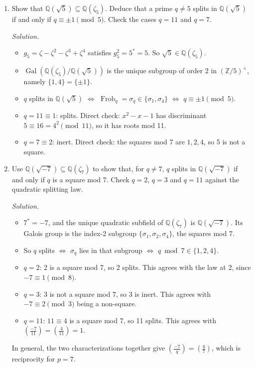 \documentclass[11pt]{article}
\newcommand{\Z}{\mathbb{Z}}
\newcommand{\Q}{\mathbb{Q}}
\newcommand{\legendre}[2]{\left(\frac{#1}{#2}\right)}
\DeclareMathOperator{\Gal}{Gal}
\DeclareMathOperator{\Frob}{Frob}
\begin{document}
\begin{enumerate}[label=\textbf{Q8.\arabic*}]
  \item Show that $\Q(\sqrt5)\subseteq\Q(\zeta_5)$. Deduce that a prime $q\ne5$ splits in $\Q(\sqrt5)$ if and only if $q\equiv\pm1\pmod5$. Check the cases $q=11$ and $q=7$.

  \textit{Solution.}
  \begin{itemize}
    \item $g_5=\zeta-\zeta^2-\zeta^3+\zeta^4$ satisfies $g_5^2=5^*=5$. So $\sqrt5\in\Q(\zeta_5)$.
    \item $\Gal(\Q(\zeta_5)/\Q(\sqrt5))$ is the unique subgroup of order 2 in $(\Z/5)^\times$, namely $\{1,4\}=\{\pm1\}$.
    \item $q$ splits in $\Q(\sqrt5)$ $\iff$ $\Frob_q=\sigma_q\in\{\sigma_1,\sigma_4\}$ $\iff$ $q\equiv\pm1\pmod5$.
    \item $q=11\equiv1$: splits. Direct check: $x^2-x-1$ has discriminant $5\equiv16=4^2\pmod{11}$, so it has roots mod 11.
    \item $q=7\equiv2$: inert. Direct check: the squares mod 7 are $1,2,4$, so 5 is not a square.
  \end{itemize}

  \item Use $\Q(\sqrt{-7})\subseteq\Q(\zeta_7)$ to show that, for $q\ne7$, $q$ splits in $\Q(\sqrt{-7})$ if and only if $q$ is a square mod 7. Check $q=2$, $q=3$ and $q=11$ against the quadratic splitting law.

  \textit{Solution.}
  \begin{itemize}
    \item $7^*=-7$, and the unique quadratic subfield of $\Q(\zeta_7)$ is $\Q(\sqrt{-7})$. Its Galois group is the index-2 subgroup $\{\sigma_1,\sigma_2,\sigma_4\}$, the squares mod 7.
    \item So $q$ splits $\iff$ $\sigma_q$ lies in that subgroup $\iff$ $q\bmod 7\in\{1,2,4\}$.
    \item $q=2$: 2 is a square mod 7, so 2 splits. This agrees with the law at 2, since $-7\equiv1\pmod 8$.
    \item $q=3$: 3 is not a square mod 7, so 3 is inert. This agrees with $-7\equiv2\pmod3$ being a non-square.
    \item $q=11$: $11\equiv4$ is a square mod 7, so 11 splits. This agrees with $\legendre{-7}{11}=\legendre{4}{11}=1$.
  \end{itemize}
  In general, the two characterizations together give $\legendre{-7}{q}=\legendre{q}{7}$, which is reciprocity for $p=7$.
\end{enumerate}
\end{document}
